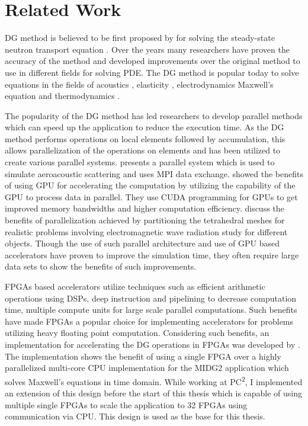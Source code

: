\section{Related Work}

\ac{DG} method is believed to be first proposed by \textcite{reed_triangular_1973} for
solving the steady-state neutron transport equation \cite{hesthaven_nodal_2008}. Over the
years many researchers have proven the accuracy of the method and developed improvements
over the original method to use in different fields for solving \ac{PDE}. The \ac{DG} method
is popular today to solve equations in the fields of acoustics \cite{wilcox_high-order_2010,
atkins_quadrature-free_1998, toulopoulos_high-order_2006}, elasticity \cite{dumbser_arbitrary_2006,
kaser_arbitrary_2006, kaser_arbitrary_2007}, electrodynamics Maxwell’s equation \cite{busch_discontinuous_2011,
cohen_discontinuous_2006, busch_discontinuous_2011, cohen_spatial_2006, cockburn_locally_2004,
konig_discontinuous_2010} and thermodynamics \cite{collis_discontinuous_2002}.

The popularity of the \ac{DG} method has led researchers to develop parallel methods
which can speed up the application to reduce the execution time. As the DG method
performs operations on local elements followed by accumulation, this allows parallelization
of the operations on elements and has been utilized to create various parallel systems.
\textcite{baggag_parallel_1999} presents a parallel system which is used to simulate aeroacoustic
scattering and uses \ac{MPI} data exchange. \textcite{klockner_nodal_2009} showed the benefits
of using GPU for accelerating the computation by utilizing the capability of the GPU to
process data in parallel. They use CUDA programming for GPUs to get improved memory bandwidths
and higher computation efficiency. \textcite{bernacki_parallel_2006} discuss the benefits
of parallelization achieved by partitioning the tetrahedral meshes for realistic problems
involving electromagnetic wave radiation study for different objects. Though the use of such
parallel architecture and use of GPU based accelerators have proven
to improve the simulation time, they often require large data sets to show the benefits of
such improvements.

FPGAs based accelerators utilize techniques such as efficient arithmetic operations using DSPs,
deep instruction and pipelining to decrease computation time, multiple compute units for
large scale parallel computations.
Such benefits have made FPGAs a popular choice for implementing accelerators for
problems utilizing heavy floating point computation. Considering such benefits,
an implementation for accelerating the \ac{DG} operations in FPGAs was
developed by \textcite{kenter_opencl-based_2018}. The implementation shows the benefit
of using a single FPGA over a highly parallelized multi-core CPU implementation for
the MIDG2 application which solves Maxwell’s equations in time domain. While working at
PC\textsuperscript{2}, I implemented an extension of this design before the start of this thesis
which is capable of using multiple single FPGAs to scale the application to 32 FPGAs using
communication via CPU. This design is used as the base for this thesis.

